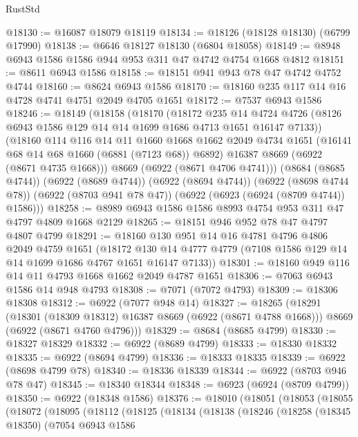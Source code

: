 \begin{lexlean}{RustStd}
\begin{coremodule}
@18130 := @16087 @18079 @18119
@18134 := @18126 (@18128 @18130) (@6799 @17990)
@18138 := @6646 @18127 @18130 (@6804 @18058)
@18149 := @8948 @6943 @1586 @1586 @944 @953 @311 @47 @4742 @4754 @1668 @4812
@18151 := @8611 @6943 @1586
@18158 := @18151 @941 @943 @78 @47 @4742 @4752 @4744
@18160 := @8624 @6943 @1586
@18170 := @18160 @235 @117 @14 @16 @4728 @4741 @4751 @2049 @4705 @1651
@18172 := @7537 @6943 @1586
@18246 := @18149
    (@18158
      (@18170
        (@18172
          @235
          @14
          @4724
          @4726
          (@8126 @6943 @1586 @129 @14 @14 @1699 @1686 @4713 @1651 @16147 @7133))
        (@18160
          @114
          @116
          @14
          @11
          @1660
          @1668
          @1662
          @2049
          @4734
          @1651
          (@16141 @68 @14 @68 @1660 (@6881 (@7123 @68)) @6892)
          @16387
          @8669
          (@6922 (@8671 @4735 @1668)))
        @8669
        (@6922 (@8671 @4706 @4741)))
      (@8684 (@8685 @4744))
      (@6922 (@8689 @4744))
      (@6922 (@8694 @4744))
      (@6922 (@8698 @4744 @78))
      (@6922 (@8703 @941 @78 @47))
      (@6922 (@6923 (@6924 (@8709 @4744)) @1586)))
@18258 := @8989 @6943 @1586 @1586 @8993 @4754 @953 @311 @47 @4797 @4809 @1668 @2129
@18265 := @18151 @946 @952 @78 @47 @4797 @4807 @4799
@18291 := @18160
    @130
    @951
    @14
    @16
    @4781
    @4796
    @4806
    @2049
    @4759
    @1651
    (@18172 @130 @14 @4777 @4779 (@7108 @1586 @129 @14 @14 @1699 @1686 @4767 @1651 @16147 @7133))
@18301 := @18160 @949 @116 @14 @11 @4793 @1668 @1662 @2049 @4787 @1651
@18306 := @7063 @6943 @1586 @14 @948 @4793
@18308 := @7071 (@7072 @4793)
@18309 := @18306 @18308
@18312 := @6922 (@7077 @948 @14)
@18327 := @18265
    (@18291
      (@18301 (@18309 @18312) @16387 @8669 (@6922 (@8671 @4788 @1668)))
      @8669
      (@6922 (@8671 @4760 @4796)))
@18329 := @8684 (@8685 @4799)
@18330 := @18327 @18329
@18332 := @6922 (@8689 @4799)
@18333 := @18330 @18332
@18335 := @6922 (@8694 @4799)
@18336 := @18333 @18335
@18339 := @6922 (@8698 @4799 @78)
@18340 := @18336 @18339
@18344 := @6922 (@8703 @946 @78 @47)
@18345 := @18340 @18344
@18348 := @6923 (@6924 (@8709 @4799))
@18350 := @6922 (@18348 @1586)
@18376 := @18010
    (@18051
      (@18053
        (@18055
          (@18072
            (@18095
              (@18112
                (@18125
                  (@18134
                    (@18138
                      (@18246
                        (@18258
                          (@18345 @18350)
                          (@7054
                            @6943
                            @1586

\end{coremodule}
\end{lexlean}
